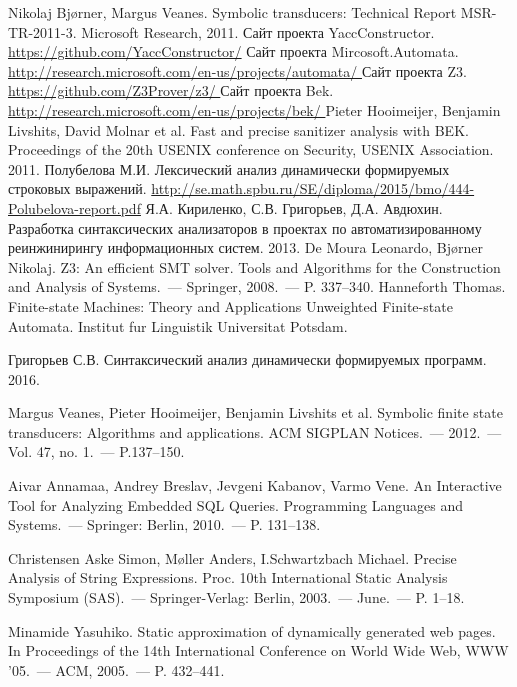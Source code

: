 \begin{thebibliography}{99}

  Nikolaj Bj{\o}rner, Margus Veanes.
  Symbolic transducers: Technical Report MSR-TR-2011-3.
  Microsoft Research, 2011.
    Сайт проекта YaccConstructor.
    \url{ https://github.com/YaccConstructor/}
    Сайт проекта Mircosoft.Automata.
    \url{ http://research.microsoft.com/en-us/projects/automata/ }
    Сайт проекта Z3.
    \url{ https://github.com/Z3Prover/z3/ }
    Сайт проекта Bek.
    \url{ http://research.microsoft.com/en-us/projects/bek/ }
  Pieter Hooimeijer, Benjamin Livshits, David Molnar et al.
  Fast and precise sanitizer analysis with BEK. 
  Proceedings of the 20th USENIX conference on Security, USENIX Association. 2011.
  Полубелова М.И. 
  Лексический анализ динамически формируемых строковых выражений.
  \url{http://se.math.spbu.ru/SE/diploma/2015/bmo/444-Polubelova-report.pdf}
  Я.А. Кириленко, С.В. Григорьев, Д.А. Авдюхин. 
  Разработка синтаксических анализаторов в проектах по автоматизированному реинжинирингу информационных систем. 
  2013. 
  De Moura Leonardo, Bj{\o}rner Nikolaj. 
  Z3: An efficient SMT solver.
  Tools and Algorithms for the Construction and Analysis of Systems.~--- Springer, 2008.~--- P. 337–340.
  Hanneforth Thomas. 
  Finite-state Machines: Theory and Applications Unweighted Finite-state Automata.
  Institut fur Linguistik Universitat Potsdam.


  Григорьев С.В.
  Синтаксический анализ динамически формируемых программ.
  2016.

  Margus Veanes, Pieter Hooimeijer, Benjamin Livshits et al.
  Symbolic finite state transducers: Algorithms and applications.
  ACM SIGPLAN Notices.~--- 2012.~--- Vol. 47, no. 1.~--- P.137–150.  

  Aivar Annamaa, Andrey Breslav, Jevgeni Kabanov, Varmo Vene.
  An Interactive Tool for Analyzing Embedded SQL Queries. 
  Programming Languages and Systems.~--- Springer: Berlin, 2010.~--- P. 131–138.

  Christensen Aske Simon, M{\o}ller Anders, I.Schwartzbach Michael.
  Precise Analysis of String Expressions. 
  Proc. 10th International Static Analysis Symposium (SAS).~--- Springer-Verlag: Berlin, 2003.~---  June.~--- P. 1–18.

  Minamide Yasuhiko.
  Static approximation of dynamically generated web pages.
  In Proceedings of the 14th International Conference on World Wide Web, WWW ’05.~--- ACM, 2005.~--- P. 432–441.
\end{thebibliography}


